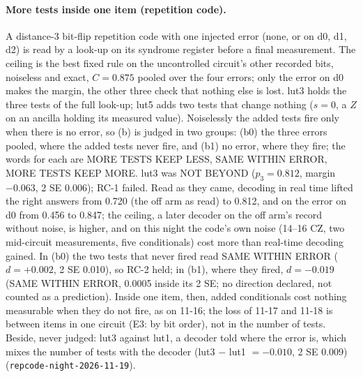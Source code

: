 \documentclass[10pt,a4paper]{article}
\begin{document}
\paragraph{More tests inside one item (repetition code).} A distance-3 bit-flip repetition code with one injected error
(none, or on d0, d1, d2) is read by a look-up on its syndrome register before a final measurement. The ceiling is the
best fixed rule on the uncontrolled circuit's other recorded bits, noiseless and exact, $C = 0.875$ pooled over the four
errors; only the error on d0 makes the margin, the other three check that nothing else is lost. lut3 holds the three
tests of the full look-up; lut5 adds two tests that change nothing ($s = 0$, a $Z$ on an ancilla holding its measured
value). Noiselessly the added tests fire only when there is no error, so (b) is judged in two groups: (b0) the three
errors pooled, where the added tests never fire, and (b1) no error, where they fire; the words for each are MORE TESTS
KEEP LESS, SAME WITHIN ERROR, MORE TESTS KEEP MORE. lut3 was NOT BEYOND ($p_3 =
0.812$, margin $-0.063$, 2 SE 0.006); RC-1 failed. Read as they came, decoding in real time lifted the right answers from
0.720 (the off arm as read) to 0.812, and on the error on d0 from 0.456 to 0.847; the ceiling, a later decoder on the
off arm's record without noise, is higher, and on this night the code's own noise (14--16 CZ, two mid-circuit
measurements, five conditionals) cost more than real-time decoding gained. In (b0) the two tests that never fired read
SAME WITHIN ERROR ($d = +0.002$, 2 SE 0.010), so RC-2 held; in (b1), where they fired, $d = -0.019$ (SAME WITHIN
ERROR, 0.0005 inside its 2 SE; no direction declared, not counted as a prediction). Inside one item, then, added
conditionals cost nothing measurable when they do not fire, as on 11-16; the loss of 11-17 and 11-18 is between items
in one circuit (E3: by bit order), not in the number of tests. Beside, never judged: lut3 against lut1, a decoder told where the error
is, which mixes the number of tests with the decoder (lut3 $-$ lut1 $= -0.010$, 2 SE 0.009)
(\texttt{repcode-night-2026-11-19}).
\end{document}
